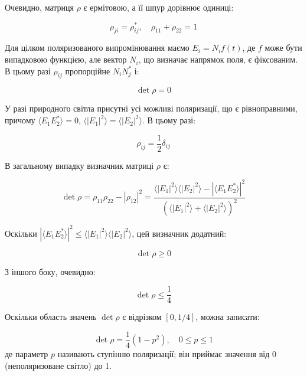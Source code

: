 Очевидно, матриця \(\rho\) є ермітовою, а її шпур дорівнює одиниці:

\begin{equation*}
\rho_{ji} = \rho_{ij}^{*}, \quad \rho_{11} + \rho_{22} = 1
\end{equation*}

Для цілком поляризованого випромінювання маємо \(E_i = N_i f(t)\), де \(f\) може бути випадковою функцією, але вектор \(N_i\), що визначає напрямок
поля, є фіксованим. В цьому разі \(\rho_{ij}\) пропорційне \(N_i N_j^{*}\) і:

\begin{equation*}
\det \rho = 0
\end{equation*}

У разі природного світла присутні усі можливі поляризації, що є рівноправними, причому \(\langle E_1 E_2^{*} \rangle = 0\), \(\langle |E_1|^2 \rangle =
\langle |E_2|^2 \rangle\). В цьому разі:

\begin{equation*}
\rho_{ij} = \frac{1}{2} \delta_{ij}
\end{equation*}

В загальному випадку визначник матриці \(\rho\) є:

\begin{equation*}
\det \rho = \rho_{11} \rho_{22} - |\rho_{12}|^2 = \frac{\langle |E_1|^2 \rangle \langle |E_2|^2 \rangle - |\langle E_1 E_2^{*} \rangle|^2}{\left(
\langle |E_1|^2 \rangle + \langle |E_2|^2 \rangle \right)^2}
\end{equation*}

Оскільки \(|\langle E_1 E_2^{*} \rangle|^2 \leq \langle |E_1|^2 \rangle \langle |E_2|^2 \rangle\), цей визначник додатний:

\begin{equation*}
\det \rho \geq 0
\end{equation*}

З іншого боку, очевидно:

\begin{equation*}
\det \rho \leq \frac{1}{4}
\end{equation*}

Оскільки область значень \(\det \rho\) є відрізком \([0, 1/4]\), можна записати:

\begin{equation}
\det \rho = \frac{1}{4} \left( 1 - p^2 \right), \quad 0 \leq p \leq 1
\label{eq:polarization_degree}
\end{equation}
%
де параметр \(p\) називають ступінню поляризації; він приймає значення від 0 (неполяризоване світло) до 1.

